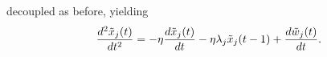 {%
decoupled as before,
yielding %
\begin{equation}\label{eq:agent-dynamics-1}
	\dfrac{d^2\tilde{x}_{j}(t)}{dt^2} =  -\eta\dfrac{d\tilde{x}_{j}(t)}{dt} - \eta\lambda_j\tilde{x}_{j}(t-1) + \dfrac{d\tilde{w}_{j}(t)}{dt}.
\end{equation}
}